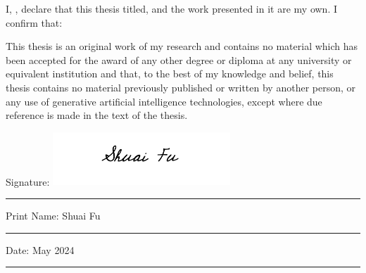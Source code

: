 \documentclass[
11pt, %
english, %
singlespacing, %
headsepline, %
]{MastersDoctoralThesis} %
\begin{document}
\begin{declaration}
\addchaptertocentry{\authorshipname} %
\noindent I, \authorname, declare that this thesis titled, \textit{\ttitle} and the work presented in it are my own. I confirm that:

This thesis is an original work of my research and contains no material which has been accepted for the award of any other degree or diploma at any university or equivalent institution and that, to the best of my knowledge and belief, this thesis contains no material previously published or written by another person, or any use of generative artificial intelligence technologies, except where due reference is made in the text of the thesis.

\vspace{1cm}

\noindent Signature: \includegraphics[height=2cm, trim={4cm 2cm 0 0},clip]{Figures/signature.png}\\
\rule[0.5em]{25em}{0.5pt} %

 \noindent Print Name: Shuai Fu\\
\rule[0.5em]{25em}{0.5pt} %

\noindent Date: May 2024\\
\rule[0.5em]{25em}{0.5pt} %
\end{declaration}

\cleardoublepage


%
%

\end{document}
